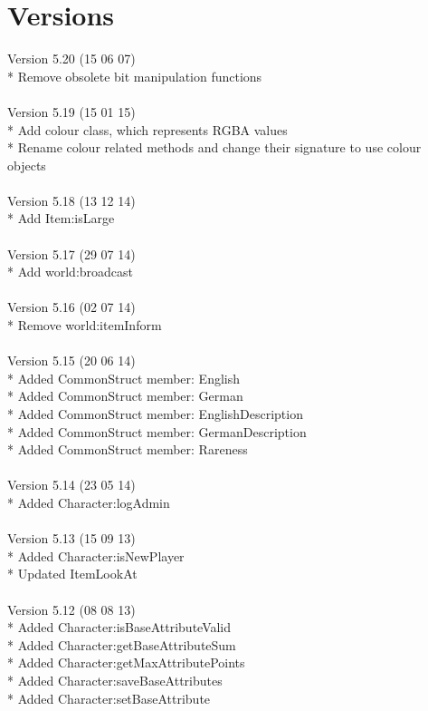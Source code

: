 \documentclass[a4paper,10pt,makeidx]{scrreprt}
\begin{document}
\chapter{Versions}
Version 5.20 (15 06 07)\\
* Remove obsolete bit manipulation functions\\
\\
Version 5.19 (15 01 15)\\
* Add colour class, which represents RGBA values\\
* Rename colour related methods and change their signature to use colour objects\\
\\
Version 5.18 (13 12 14)\\
* Add Item:isLarge\\
\\
Version 5.17 (29 07 14)\\
* Add world:broadcast\\
\\
Version 5.16 (02 07 14)\\
* Remove world:itemInform\\
\\
Version 5.15 (20 06 14)\\
* Added CommonStruct member: English\\
* Added CommonStruct member: German\\
* Added CommonStruct member: EnglishDescription\\
* Added CommonStruct member: GermanDescription\\
* Added CommonStruct member: Rareness\\
\\
Version 5.14 (23 05 14)\\
* Added Character:logAdmin\\
\\
Version 5.13 (15 09 13)\\
* Added Character:isNewPlayer\\
* Updated ItemLookAt\\
\\
Version 5.12 (08 08 13)\\
* Added Character:isBaseAttributeValid\\
* Added Character:getBaseAttributeSum\\
* Added Character:getMaxAttributePoints\\
* Added Character:saveBaseAttributes\\
* Added Character:setBaseAttribute\\
\end{document}
